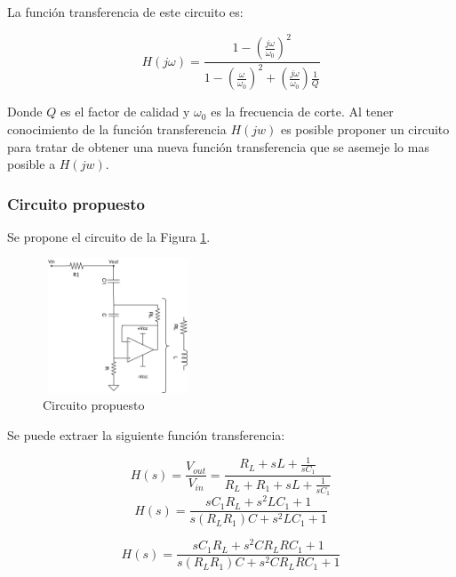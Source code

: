 \documentclass[12pt,a4paper]{article}
\begin{document}
La función transferencia de este circuito es:

\begin{equation} H(j\omega) = \frac{1-(\frac{j\omega}{\omega_0})^2}{1 - (\frac{\omega}{\omega_0})^{2} + (\frac{j\omega}{\omega_0})\frac{1}{Q}} \label{equ:trans_clasica_br}\end{equation}  

Donde $Q$ es el factor de calidad y $\omega_0$ es la frecuencia de corte.      
Al tener conocimiento de la función transferencia $H(jw)$ es posible proponer un circuito para tratar de obtener una nueva función transferencia que se asemeje lo mas posible a $H(jw)$. 

\subsubsection{Circuito propuesto}
Se propone el circuito de la Figura \ref{fig:ej2_BR_propuesto}. 

\begin{figure}[!]                                                       
\centering\includegraphics[width=0.4\textwidth, height=4cm]{Resources/ej2_br_gyrator.png}
\caption{Circuito propuesto}
\label{fig:ej2_BR_propuesto}
\end{figure}

Se puede extraer la siguiente función transferencia:

\begin{displaymath} H(s)= \frac{V_{out}}{V_{in}} = \frac{R_L + sL + \frac{1}{sC_1}}{R_L + R_1 +sL + \frac{1}{sC_1}} \end{displaymath}  
\begin{displaymath} H(s)= \frac{sC_1R_L + s^2LC_1 + 1}{s (R_L R_1)C + s^2LC_1 + 1} \end{displaymath}

\begin{displaymath} H(s)= \frac{sC_1R_L + s^2CR_LRC_1 + 1}{s (R_L R_1)C+ s^2CR_LRC_1 + 1} \end{displaymath}
\end{document}
